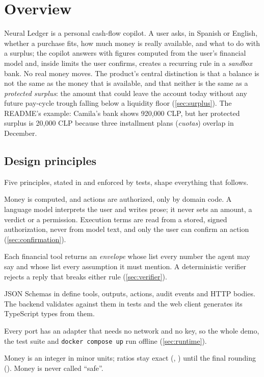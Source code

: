 \section{Overview}\label{sec:overview}

Neural Ledger is a personal cash-flow copilot. A user asks, in Spanish or English, whether a purchase fits, how much
money is really available, and what to do with a surplus; the copilot answers with figures computed from the user's
financial model and, inside limits the user confirms, creates a recurring rule in a \emph{sandbox} bank. No real money
moves. The product's central distinction is that a balance is not the same as the money that is available, and that
neither is the same as a \emph{protected surplus}: the amount that could leave the account today without any future
pay-cycle trough falling below a liquidity floor (\cref{sec:surplus}). The README's example: Camila's bank shows
920{,}000 CLP, but her protected surplus is 20{,}000 CLP because three installment plans (\emph{cuotas}) overlap in
December.

\subsection{Design principles}\label{sec:principles}

Five principles, stated in  and enforced by tests, shape everything that follows.

\begin{description}[style=nextline,leftmargin=1.2em]
  \item[Deterministic authority.] Money is computed, and actions are authorized, only by domain code. A language model
    interprets the user and writes prose; it never sets an amount, a verdict or a permission. Execution terms are read
    from a stored, signed authorization, never from model text, and only the user can confirm an action
    (\cref{sec:confirmation}).
  \item[Every number is a fact.] Each financial tool returns an \emph{envelope} whose  list every number the
    agent may say and whose  list every assumption it must mention. A deterministic verifier rejects a
    reply that breaks either rule (\cref{sec:verifier}).
  \item[Contracts first.] JSON Schemas in  define tools, outputs, actions, audit events and HTTP bodies.
    The backend validates against them in tests and the web client generates its TypeScript types from them.
  \item[Offline is a requirement.] Every port has an adapter that needs no network and no key, so the whole demo, the
    test suite and \texttt{docker compose up} run offline (\cref{sec:runtime}).
  \item[Exact money.] Money is an integer in minor units; ratios stay exact (, ) until the
    final rounding (). Money is never called ``safe''.
\end{description}

